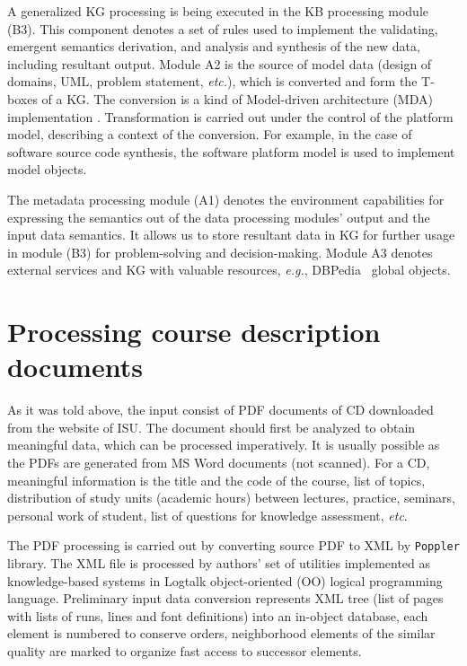 \documentclass[
]{aiitart}
\begin{document}
A generalized KG processing is being executed in the KB processing module (B3).  This component denotes a set of rules used to implement the validating, emergent semantics derivation, and analysis and synthesis of the new data, including resultant output.  Module A2 is the source of model data (design of domains, UML, problem statement, \emph{etc.}), which is converted and form the T-boxes of a KG.  The conversion is a kind of Model-driven architecture (MDA) implementation \cite{b2}.  Transformation is carried out under the control of the platform model, describing a context of the conversion.  For example, in the case of software source code synthesis, the software platform model is used to implement model objects.

The metadata processing module (A1) denotes the environment capabilities for expressing the semantics out of the data processing modules' output and the input data semantics.  It allows us to store resultant data in KG for further usage in module (B3) for problem-solving and decision-making.  Module A3 denotes external services and KG with valuable resources, \emph{e.g.}, DBPedia~\cite{b3} global objects.

\section{Processing course description documents}

As it was told above, the input consist of PDF documents of CD downloaded from the website of ISU.  The document should first be analyzed to obtain meaningful data, which can be processed imperatively.  It is usually possible as the PDFs are generated from MS Word documents (not scanned).  For a CD, meaningful information is the title and the code of the course, list of topics, distribution of study units (academic hours) between lectures, practice, seminars, personal work of student, list of questions for knowledge assessment, \emph{etc}.

The PDF processing is carried out by converting source PDF to XML by \verb|Poppler| library.  The XML file is processed by authors' set of utilities implemented as knowledge-based systems in Logtalk \cite{logtalk} object-oriented (OO) logical programming language.  Preliminary input data conversion represents XML tree (list of pages with lists of runs, lines and font definitions) into an in-object database, each element is numbered to conserve orders, neighborhood elements of the similar quality are marked to organize fast access to successor elements.
\end{document}
